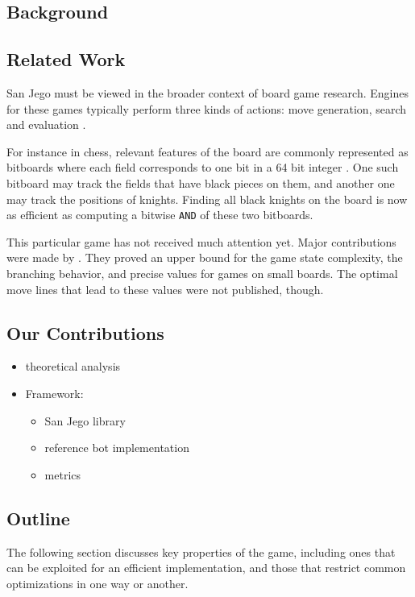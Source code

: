 \documentclass[sigconf]{acmart}
\begin{document}
\subsection{Background}

\subsection{Related Work}
San Jego must be viewed in the broader context of board game research.
Engines for these games typically perform three kinds of actions: move generation, search and evaluation \cite{Bimonugroho2020}.

For instance in chess, relevant features of the board are commonly represented as bitboards where each field corresponds to one bit in a 64 bit integer \cite{Bimonugroho2020}.
One such bitboard may track the fields that have black pieces on them, and another one may track the positions of knights.
Finding all black knights on the board is now as efficient as computing a bitwise \texttt{AND} of these two bitboards.

This particular game has not received much attention yet.
Major contributions were made by \citeauthor{Althöfer2020} \cite{Althöfer2020}.
They proved an upper bound for the game state complexity, the branching behavior, and precise values for games on small boards.
The optimal move lines that lead to these values were not published, though.

\subsection{Our Contributions}
\begin{itemize}
  \item theoretical analysis
  \item Framework:
  \begin{itemize}
    \item San Jego library
    \item reference bot implementation
    \item metrics
  \end{itemize}
\end{itemize}

\subsection{Outline}
The following section discusses key properties of the game, including ones that can be exploited for an efficient implementation, and those that restrict common optimizations in one way or another.
\end{document}
